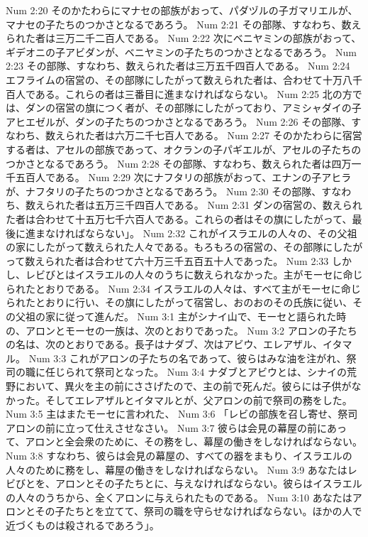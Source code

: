 Num 2:20  そのかたわらにマナセの部族がおって、パダヅルの子ガマリエルが、マナセの子たちのつかさとなるであろう。
Num 2:21  その部隊、すなわち、数えられた者は三万二千二百人である。
Num 2:22  次にベニヤミンの部族がおって、ギデオニの子アビダンが、ベニヤミンの子たちのつかさとなるであろう。
Num 2:23  その部隊、すなわち、数えられた者は三万五千四百人である。
Num 2:24  エフライムの宿営の、その部隊にしたがって数えられた者は、合わせて十万八千百人である。これらの者は三番目に進まなければならない。
Num 2:25  北の方では、ダンの宿営の旗につく者が、その部隊にしたがっており、アミシャダイの子アヒエゼルが、ダンの子たちのつかさとなるであろう。
Num 2:26  その部隊、すなわち、数えられた者は六万二千七百人である。
Num 2:27  そのかたわらに宿営する者は、アセルの部族であって、オクランの子パギエルが、アセルの子たちのつかさとなるであろう。
Num 2:28  その部隊、すなわち、数えられた者は四万一千五百人である。
Num 2:29  次にナフタリの部族がおって、エナンの子アヒラが、ナフタリの子たちのつかさとなるであろう。
Num 2:30  その部隊、すなわち、数えられた者は五万三千四百人である。
Num 2:31  ダンの宿営の、数えられた者は合わせて十五万七千六百人である。これらの者はその旗にしたがって、最後に進まなければならない」。
Num 2:32  これがイスラエルの人々の、その父祖の家にしたがって数えられた人々である。もろもろの宿営の、その部隊にしたがって数えられた者は合わせて六十万三千五百五十人であった。
Num 2:33  しかし、レビびとはイスラエルの人々のうちに数えられなかった。主がモーセに命じられたとおりである。
Num 2:34  イスラエルの人々は、すべて主がモーセに命じられたとおりに行い、その旗にしたがって宿営し、おのおのその氏族に従い、その父祖の家に従って進んだ。
Num 3:1  主がシナイ山で、モーセと語られた時の、アロンとモーセの一族は、次のとおりであった。
Num 3:2  アロンの子たちの名は、次のとおりである。長子はナダブ、次はアビウ、エレアザル、イタマル。
Num 3:3  これがアロンの子たちの名であって、彼らはみな油を注がれ、祭司の職に任じられて祭司となった。
Num 3:4  ナダブとアビウとは、シナイの荒野において、異火を主の前にささげたので、主の前で死んだ。彼らには子供がなかった。そしてエレアザルとイタマルとが、父アロンの前で祭司の務をした。
Num 3:5  主はまたモーセに言われた、
Num 3:6  「レビの部族を召し寄せ、祭司アロンの前に立って仕えさせなさい。
Num 3:7  彼らは会見の幕屋の前にあって、アロンと全会衆のために、その務をし、幕屋の働きをしなければならない。
Num 3:8  すなわち、彼らは会見の幕屋の、すべての器をまもり、イスラエルの人々のために務をし、幕屋の働きをしなければならない。
Num 3:9  あなたはレビびとを、アロンとその子たちとに、与えなければならない。彼らはイスラエルの人々のうちから、全くアロンに与えられたものである。
Num 3:10  あなたはアロンとその子たちとを立てて、祭司の職を守らせなければならない。ほかの人で近づくものは殺されるであろう」。
